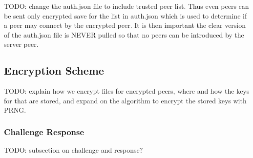 TODO: change the auth.json file to include trusted peer list.
Thus even peers can be sent only encrypted save for the list in auth.json which is used to determine if a peer may connect by the encrypted peer.
It is then important the clear version of the auth.json file is NEVER pulled so that no peers can be introduced by the server peer.

\subsection{Encryption Scheme}
\label{sub:Encryption Scheme}

TODO: explain how we encrypt files for encrypted peers, where and how the keys for that are stored, and expand on the algorithm to encrypt the stored keys with PRNG.

\subsubsection{Challenge Response}
\label{subs:Challenge Response}

TODO: subsection on challenge and response?

